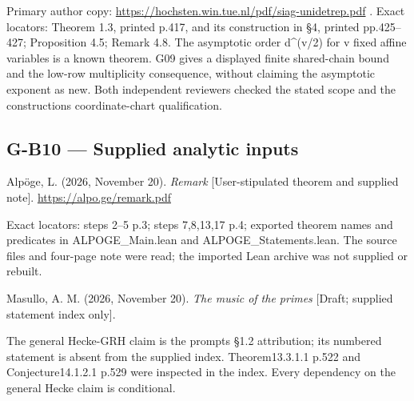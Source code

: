 \documentclass[11pt,a4paper]{article}
\theoremstyle{definition}\newtheorem{definition}{Definition}
\begin{document}
Primary author copy:
\url{https://hochsten.win.tue.nl/pdf/siag-unidetrep.pdf} . Exact
locators: Theorem 1.3, printed p.417, and its construction in §4,
printed pp.425--427; Proposition 4.5; Remark 4.8. The asymptotic order
d\^{}(v/2) for v fixed affine variables is a known theorem. G09 gives a
displayed finite shared-chain bound and the low-row multiplicity
consequence, without claiming the asymptotic exponent as new. Both
independent reviewers checked the stated scope and the
construction\textquotesingle s coordinate-chart qualification.

\subsection{G-B10 --- Supplied analytic
inputs}\label{g-b10--supplied-analytic-inputs}

Alpöge, L. (2026, November 20). \emph{Remark} {[}User-stipulated theorem
and supplied note{]}. \url{https://alpo.ge/remark.pdf}

Exact locators: steps 2--5 p.3; steps 7,8,13,17 p.4; exported theorem
names and predicates in ALPOGE\_Main.lean and ALPOGE\_Statements.lean.
The source files and four-page note were read; the imported Lean archive
was not supplied or rebuilt.

Masullo, A. M. (2026, November 20). \emph{The music of the primes}
{[}Draft; supplied statement index only{]}.

The general Hecke-GRH claim is the prompt\textquotesingle s §1.2
attribution; its numbered statement is absent from the supplied index.
Theorem13.3.1.1 p.522 and Conjecture14.1.2.1 p.529 were inspected in the
index. Every dependency on the general Hecke claim is conditional.
\end{document}
